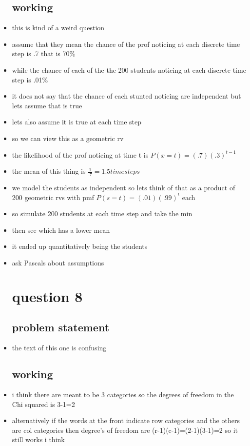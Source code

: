 \documentclass{article}
\begin{document}
\begin{itemize}
\subsection{working }
\item this is kind of a weird question
\item assume that they mean the chance of the prof noticing at each discrete time step is .7 that is 70\%
\item while the chance of each of the the 200 students noticing at each discrete time step is .01\% 
\item it does not say that the chance of each stunted noticing are independent but lets assume that is true 
\item lets also assume it is true at each time step
\item so we can view this as a geometric rv
\item the likelihood of the prof noticing at time t is $P(x=t)=(.7)(.3)^{t-1}$
\item the mean of this thing is $\frac{1}{.7}=1.5 time steps$
\item we model the students as independent so lets think of that as a product of 200 geometric rvs with pmf $P(s=t)=(.01)(.99)^t$ each 
\item so simulate 200 students at each time step and take the min 
\item then see which has a lower mean 
\item it ended up quantitatively being the students
\item ask Pascals about assumptions 
\section{question 8}
\subsection{problem statement}
\item the text of this one is confusing 
\subsection{working}
\item i think there are meant to be 3 categories so the degrees of freedom in the Chi squared is 3-1=2
\item alternatively if the words at the front indicate row categories and the others are col categories then degree's of freedom are (r-1)(c-1)=(2-1)(3-1)=2 so it still works i think 



\end{itemize}
\end{document}
